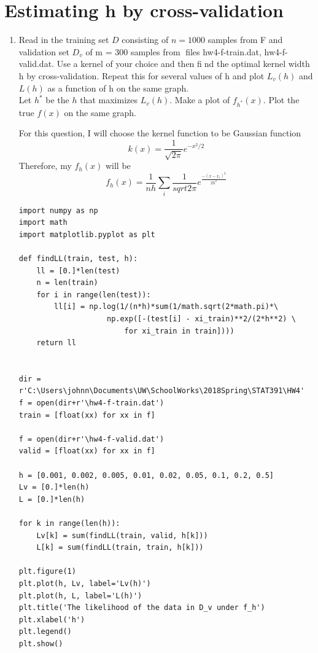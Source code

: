 \documentclass[preprint,12pt]{elsarticle}
\begin{document}
    \section{Estimating h by cross-validation}
    \begin{enumerate}[label=\alph*]
        \item Read in the training set $D$ consisting of $n = 1000$ samples from F and 
        validation set $D_v$ of m = 300 samples from files hw4-f-train.dat, hw4-f-valid.dat. 
        Use a kernel of your choice and then find the optimal kernel width h by 
        cross-validation. Repeat this for several values of h and plot $L_v(h)$ and $L(h)$ as a
        function of h on the same graph.\\
        Let $h^{*}$ be the $h$ that maximizes $L_v(h)$. Make a plot of $f_{h^{*}}(x)$. Plot
        the true $f(x)$ on the same graph.

        For this question, I will choose the kernel function to be Gaussian function
        \begin{equation*}
            k(x) = \frac{1}{\sqrt{2\pi}}e^{-x^2/2}
        \end{equation*}
        Therefore, my $f_h(x)$ will be 
        \begin{equation*}
            f_h(x) = \frac{1}{nh}\sum_{i} \frac{1}{sqrt{2\pi}}e^{\frac{-(x-x_i)^2}{2h^2}}
        \end{equation*}
        \begin{lstlisting}
import numpy as np
import math 
import matplotlib.pyplot as plt

def findLL(train, test, h):
    ll = [0.]*len(test)
    n = len(train)
    for i in range(len(test)):
        ll[i] = np.log(1/(n*h)*sum(1/math.sqrt(2*math.pi)*\
                    np.exp([-(test[i] - xi_train)**2/(2*h**2) \
                        for xi_train in train])))
    return ll


dir = r'C:\Users\johnn\Documents\UW\SchoolWorks\2018Spring\STAT391\HW4'
f = open(dir+r'\hw4-f-train.dat')
train = [float(xx) for xx in f]

f = open(dir+r'\hw4-f-valid.dat')
valid = [float(xx) for xx in f]

h = [0.001, 0.002, 0.005, 0.01, 0.02, 0.05, 0.1, 0.2, 0.5]
Lv = [0.]*len(h)
L = [0.]*len(h)

for k in range(len(h)):
    Lv[k] = sum(findLL(train, valid, h[k]))
    L[k] = sum(findLL(train, train, h[k]))

plt.figure(1)
plt.plot(h, Lv, label='Lv(h)')
plt.plot(h, L, label='L(h)')
plt.title('The likelihood of the data in D_v under f_h')
plt.xlabel('h')
plt.legend()
plt.show()


\end{lstlisting}
\end{enumerate}
\end{document}
